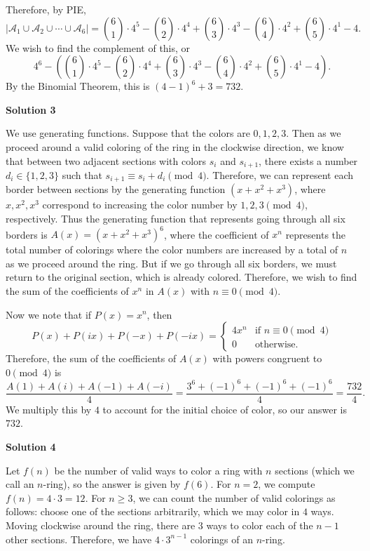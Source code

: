 \begin{enumerate}
 Therefore, by PIE,
 \[|\mathcal{A}_1\cup\mathcal{A}_2\cup\cdots\cup\mathcal{A}_6|=\binom{6}{1}\cdot 4^5-\binom{6}{2}\cdot 4^4+\binom{6}{3}\cdot 4^3-\binom{6}{4}\cdot 4^2+\binom{6}{5}\cdot 4^1-4.\]We wish to find the complement of this, or 
 \[4^6-\left(\binom{6}{1}\cdot 4^5-\binom{6}{2}\cdot 4^4+\binom{6}{3}\cdot 4^3-\binom{6}{4}\cdot 4^2+\binom{6}{5}\cdot 4^1-4\right).\]By the Binomial Theorem, this is $(4-1)^6+3=\boxed{732}$.

 



\textbf{Solution 3}

We use generating functions. Suppose that the colors are $0,1,2,3$.  Then as we proceed around a valid coloring of the ring in the clockwise direction, we know that between two adjacent sections with colors $s_i$ and $s_{i+1}$, there exists a number $d_i\in\{1,2,3\}$ such that $s_{i+1}\equiv s_i+d_i\pmod{4}$. Therefore, we can represent each border between sections by the generating function $(x+x^2+x^3)$, where $x,x^2,x^3$ correspond to increasing the color number by $1,2,3\pmod4$, respectively. Thus the generating function that represents going through all six borders is $A(x)=(x+x^2+x^3)^6$, where the coefficient of $x^n$ represents the total number of colorings where the color numbers are increased by a total of $n$ as we proceed around the ring. But if we go through all six borders, we must return to the original section, which is already colored. Therefore, we wish to find the sum of the coefficients of $x^n$ in $A(x)$ with $n\equiv 0\pmod4$.

 Now we note that if $P(x)=x^n$, then
 \[P(x)+P(ix)+P(-x)+P(-ix)=\begin{cases}4x^n&\text{if } n\equiv0\pmod{4}\\0&\text{otherwise}.\end{cases}\]Therefore, the sum of the coefficients of $A(x)$ with powers congruent to $0\pmod 4$ is
 \[\frac{A(1)+A(i)+A(-1)+A(-i)}{4}=\frac{3^6+(-1)^6+(-1)^6+(-1)^6}{4}=\frac{732}{4}.\]We multiply this by $4$ to account for the initial choice of color, so our answer is $\boxed{732}$.

 



\textbf{Solution 4}

Let $f(n)$ be the number of valid ways to color a ring with $n$ sections (which we call an $n$-ring), so the answer is given by $f(6)$. For $n=2$, we compute $f(n)=4\cdot3=12$. For $n \ge 3$, we can count the number of valid colorings as follows: choose one of the sections arbitrarily, which we may color in $4$ ways. Moving clockwise around the ring, there are $3$ ways to color each of the $n-1$ other sections. Therefore, we have $4 \cdot 3^{n-1}$ colorings of an $n$-ring.


\end{enumerate}
